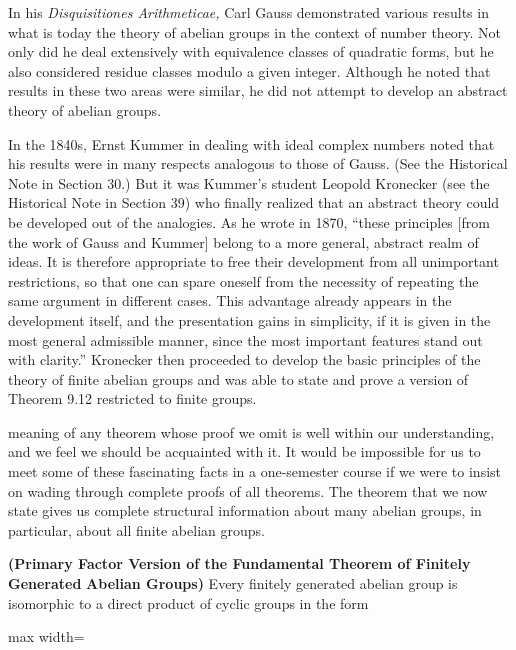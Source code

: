\documentclass[11pt,oneside]{article}
\begin{document}
\begin{BookBody}


\noindent In his\textit{ Disquisitiones Arithmeticae,} Carl Gauss demonstrated various results in what is today the theory of abelian groups in the context of number theory. Not only did he deal extensively with equivalence classes of quadratic forms, but he also considered residue classes modulo a given integer. Although he noted that results in these two areas were similar, he did not attempt to develop an abstract theory of abelian groups.

\noindent In the 1840s, Ernst Kummer in dealing with ideal complex numbers noted that his results were in many respects analogous to those of Gauss. (See the Historical Note in Section 30.) But it was Kummer’s student Leopold Kronecker (see the Historical Note in Section 39) who finally realized that an abstract theory could be developed out of the analogies. As he wrote in 1870, “these principles [from the work of Gauss and Kummer] belong to a more general, abstract realm of ideas. It is therefore appropriate to free their development from all unimportant restrictions, so that one can spare oneself from the necessity of repeating the same argument in different cases. This advantage already appears in the development itself, and the presentation gains in simplicity, if it is given in the most general admissible manner, since the most important features stand out with clarity.” Kronecker then proceeded to develop the basic principles of the theory of finite abelian groups and was able to state and prove a version of Theorem 9.12 restricted to finite groups.

\noindent meaning of any theorem whose proof we omit is well within our understanding, and we feel we should be acquainted with it. It would be impossible for us to meet some of these fascinating facts in a one-semester course if we were to insist on wading through complete proofs of all theorems. The theorem that we now state gives us complete structural information about many abelian groups, in particular, about all finite abelian groups.

 \textbf{(Primary Factor Version of the Fundamental Theorem of Finitely Generated} \textbf{Abelian Groups)} Every finitely generated abelian group  is isomorphic to a direct product of cyclic groups in the form

\begin{center}\begin{adjustbox}{max width=\linewidth}\end{adjustbox}\end{center}


\end{BookBody}
\end{document}
